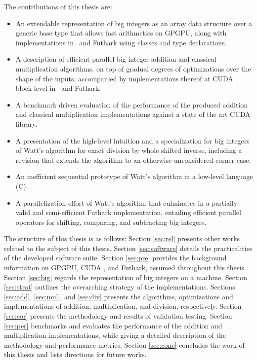 The contributions of this thesis are:
\begin{itemize}
\item An extendable representation of big integers as an array data structure
  over a generic base type that allows fast arithmetics on GPGPU, along with
  implementations in \cpp\ and Futhark using classes and type declarations.
\item A description of efficient parallel big integer addition and classical
  multiplication algorithms, on top of gradual degrees of optimizations over the
  shape of the inputs, accompanied by implementations thereof at CUDA
  block-level in \cpp\ and Futhark.
\item A benchmark driven evaluation of the performance of the produced addition
  and classical multiplication implementations against a state of the art CUDA
  library.
\item A presentation of the high-level intuition and a specialization for big
  integers of Watt's algorithm for exact division by whole shifted inverse,
  including a revision that extends the algorithm to an otherwise unconsidered
  corner case.
\item An inefficient sequential prototype of Watt's algorithm in a low-level
  language (C).
\item A parallelization effort of Watt's algorithm that culminates in a
  partially valid and semi-efficient Futhark implementation, entailing efficient
  parallel operators for shifting, comparing, and subtracting big integers.
\end{itemize}
\bigskip

The structure of this thesis is as follows: Section \ref{sec:rel} presents other
works related to the subject of this thesis. Section \ref{sec:software} details
the practicalities of the developed software suite. Section \ref{sec:pre}
provides the background information on GPGPU, CUDA \cpp, and Futhark, assumed
throughout this thesis. Section \ref{sec:big} regards the representation of big
integers on a machine. Section \ref{sec:strat} outlines the overarching strategy
of the implementations. Sections \ref{sec:add}, \ref{sec:mul}, and \ref{sec:div}
presents the algorithms, optimizations and implementations of addition,
multiplication, and division, respectively. Section \ref{sec:cor} presents the
methodology and results of validation testing. Section \ref{sec:per} benchmarks
and evaluates the performance of the addition and multiplication
implementations, while giving a detailed description of the methodology and
performance metrics. Section \ref{sec:conc} concludes the work of this thesis
and lists directions for future works.

